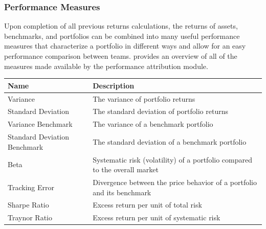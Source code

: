 \subsubsection{Performance Measures}
Upon completion of all previous returns calculations, the returns of assets, benchmarks, and portfolios can be combined into many useful performance measures that characterize a portfolio in different ways and allow for an easy performance comparison between teams.  provides an overview of all of the measures made available by the performance attribution module.

\begin{table}[h!]
    \begin{tabular}{lp{8cm}}
        \toprule
        Name                              & Description                                                                                                 \\
        \midrule
        Variance                          & The variance of portfolio returns                                                                           \\
        Standard Deviation                & The standard deviation of portfolio returns                                                                 \\
        Variance Benchmark                       & The variance of a benchmark portfolio                                                                       \\
        Standard Deviation Benchmark             & The standard deviation of a benchmark portfolio                                                             \\
        Beta                              & Systematic risk (volatility) of a portfolio compared to the overall market                                  \\
        Tracking Error                    & Divergence between the price behavior of a portfolio and its benchmark                                      \\
        Sharpe Ratio                      & Excess return per unit of total risk                                                                        \\
        Traynor Ratio                     & Excess return per unit of systematic risk                                                                   \\

\end{tabular}
\end{table}
